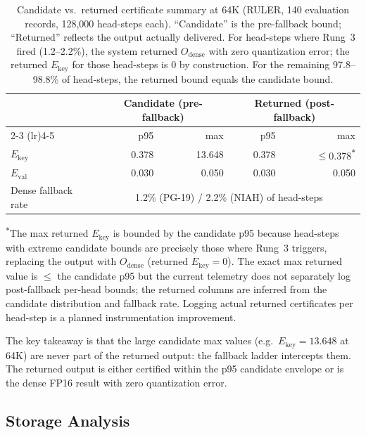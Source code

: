 \documentclass[10pt,twocolumn,a4paper]{article}
\theoremstyle{definition}
\theoremstyle{remark}
\begin{document}
\begin{table}[!t]
\centering
\caption{Candidate vs.\ returned certificate summary at 64K (RULER, 140 evaluation records, 128{,}000 head-steps each).  ``Candidate'' is the pre-fallback bound; ``Returned'' reflects the output actually delivered.  For head-steps where Rung~3 fired (1.2--2.2\%), the system returned $O_{\mathrm{dense}}$ with zero quantization error; the returned $E_{\mathrm{key}}$ for those head-steps is 0 by construction.  For the remaining 97.8--98.8\% of head-steps, the returned bound equals the candidate bound.}
\label{tab:returned_cert}
\small
\begin{tabular}{lrrrr}
\toprule
& \multicolumn{2}{c}{\textbf{Candidate (pre-fallback)}} & \multicolumn{2}{c}{\textbf{Returned (post-fallback)}} \\
\cmidrule(lr){2-3} \cmidrule(lr){4-5}
& p95 & max & p95 & max \\
\midrule
$E_{\mathrm{key}}$ & 0.378 & 13.648 & 0.378 & $\leq$0.378\textsuperscript{$\ast$} \\
$E_{\mathrm{val}}$ & 0.030 & 0.050 & 0.030 & 0.050 \\
Dense fallback rate & \multicolumn{4}{c}{1.2\% (PG-19) / 2.2\% (NIAH) of head-steps} \\
\bottomrule
\end{tabular}

\raggedright
{\footnotesize \textsuperscript{$\ast$}The max returned $E_{\mathrm{key}}$ is bounded by the candidate p95 because head-steps with extreme candidate bounds are precisely those where Rung~3 triggers, replacing the output with $O_{\mathrm{dense}}$ (returned $E_{\mathrm{key}}{=}0$).  The exact max returned value is $\leq$ the candidate p95 but the current telemetry does not separately log post-fallback per-head bounds; the returned columns are inferred from the candidate distribution and fallback rate.  Logging actual returned certificates per head-step is a planned instrumentation improvement.}
\end{table}

The key takeaway is that the large candidate max values (e.g.\ $E_{\mathrm{key}}{=}13.648$ at 64K) are never part of the returned output: the fallback ladder intercepts them.  The returned output is either certified within the p95 candidate envelope or is the dense FP16 result with zero quantization error.

\subsection{Storage Analysis}
\label{sec:storage}
\end{document}
